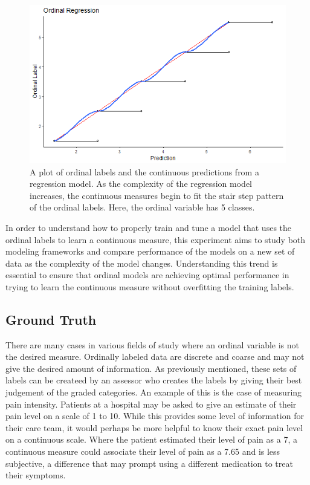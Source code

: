 \documentclass[10pt]{article}\usepackage[]{graphicx}\usepackage[]{xcolor}
\begin{document}
\begin{figure}[htp]
  \centering
  \includegraphics[scale=0.8]{general_graphics/ordinal_v_regression.png}
  \caption{A plot of ordinal labels and the continuous predictions from a regression model. As the complexity of the regression model increases, the continuous measures begin to fit the stair step pattern of the ordinal labels. Here, the ordinal variable has 5 classes.}
  \label{img:ordinal}
\end{figure}

In order to understand how to properly train and tune a model that uses the ordinal labels to learn a continuous measure, this experiment aims to study both modeling frameworks and compare performance of the models on a new set of data as the complexity of the model changes. Understanding this trend is essential to ensure that ordinal models are achieving optimal performance in trying to learn the continuous measure without overfitting the training labels.

\subsection{Ground Truth}
There are many cases in various fields of study where an ordinal variable is not the desired measure. Ordinally labeled data are discrete and coarse and may not give the desired amount of information. As previously mentioned, these sets of labels can be createed by an assessor who creates the labels by giving their best judgement of the graded categories. An example of this is the case of measuring pain intensity. Patients at a hospital may be asked to give an estimate of their pain level on a scale of 1 to 10. While this provides some level of information for their care team, it would perhaps be more helpful to know their exact pain level on a continuous scale. Where the patient estimated their level of pain as a 7, a continuous measure could associate their level of pain as a 7.65 and is less subjective, a difference that may prompt using a different medication to treat their symptoms.
\end{document}
